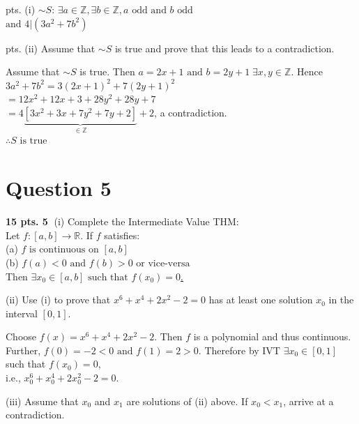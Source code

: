 \documentclass{article}
\begin{document}
\vspace{0.3cm}
 pts. (i) $\sim S$: \underline{ $\exists a \in \mathbb{Z}, \exists b \in \mathbb{Z}, a \text{ odd and } b \text{ odd}$ } \\
\hspace{2.5cm} \underline{ $\text{and } 4 | (3a^2 + 7b^2)$ }

\vspace{0.3cm}
 pts. (ii) Assume that $\sim S$ is true and prove that this leads to a contradiction.

\vspace{0.3cm}
\noindent Assume that $\sim S$ is true. Then $a = 2x+1 \text{ and } b = 2y+1 \;\exists x, y \in \mathbb{Z}$. Hence $3a^2 + 7b^2 = 3(2x+1)^2 + 7(2y+1)^2$ \\
$= 12x^2 + 12x + 3 + 28y^2 + 28y + 7$ \\
$= 4\underbrace{[3x^2 + 3x + 7y^2 + 7y + 2]}_{\in \mathbb{Z}} + 2$, a contradiction. \\
$\therefore S \text{ is true}$

\vspace{0.5cm}

\section*{Question 5}
\textbf{15 pts. \textcircled{5}} (i) Complete the Intermediate Value THM: \\
Let $f: [a,b] \to \mathbb{R}$. If $f$ satisfies: \\
(a) \underline{ $f \text{ is continuous on } [a,b]$ } \\
(b) \underline{ $f(a) < 0 \text{ and } f(b) > 0 \text{ or vice-versa}$ } \\
Then \underline{ $\exists x_0 \in [a,b] \text{ such that } f(x_0) = 0$. }

\vspace{0.3cm}
\noindent (ii) Use (i) to prove that $x^6 + x^4 + 2x^2 - 2 = 0$ has at least one solution $x_0$ in the interval $[0,1]$.

\vspace{0.3cm}
\noindent Choose $f(x) = x^6 + x^4 + 2x^2 - 2$. Then $f$ is a polynomial and thus continuous. Further, $f(0) = -2 < 0 \text{ and } f(1) = 2 > 0$. Therefore by IVT $\exists x_0 \in [0,1]$ such that $f(x_0) = 0$, \\
i.e., $x_0^6 + x_0^4 + 2x_0^2 - 2 = 0$.

\vspace{0.3cm}
\noindent (iii) Assume that $x_0$ and $x_1$ are solutions of (ii) above. If $x_0 < x_1$, arrive at a contradiction.
\end{document}
